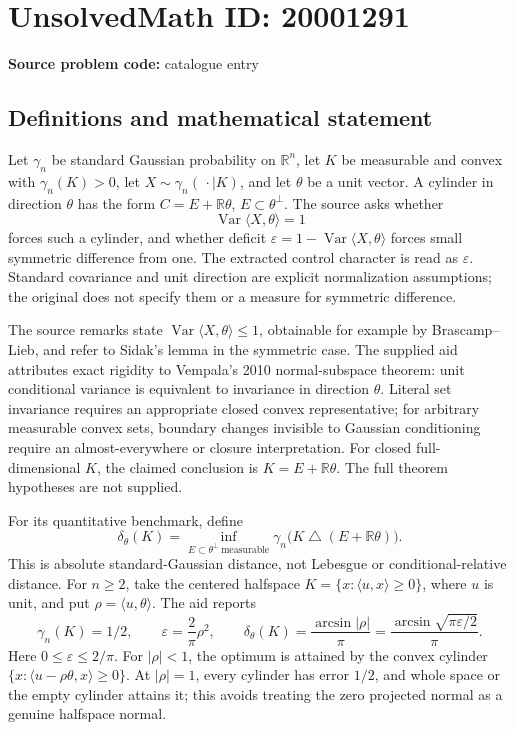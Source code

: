 \documentclass[11pt]{article}
\newcommand{\R}{\mathbb{R}}
\begin{document}
\section*{UnsolvedMath ID: 20001291}
\textbf{Source problem code:} catalogue entry
\subsection{Definitions and mathematical statement}
Let \(\gamma_n\) be standard Gaussian probability on \(\R^n\), let \(K\) be measurable and convex with \(\gamma_n(K)>0\), let \(X\sim\gamma_n(\,\cdot\mid K)\), and let \(\theta\) be a unit vector. A cylinder in direction \(\theta\) has the form \(C=E+\R\theta\), \(E\subset\theta^\perp\). The source asks whether
\[
 \operatorname{Var}\langle X,\theta\rangle=1
\]
forces such a cylinder, and whether deficit \(\varepsilon=1-\operatorname{Var}\langle X,\theta\rangle\) forces small symmetric difference from one. The extracted control character is read as \(\varepsilon\). Standard covariance and unit direction are explicit normalization assumptions; the original does not specify them or a measure for symmetric difference.

The source remarks state \(\operatorname{Var}\langle X,\theta\rangle\le1\), obtainable for example by Brascamp--Lieb, and refer to Sidak's lemma in the symmetric case. The supplied aid attributes exact rigidity to Vempala's 2010 normal-subspace theorem: unit conditional variance is equivalent to invariance in direction \(\theta\). Literal set invariance requires an appropriate closed convex representative; for arbitrary measurable convex sets, boundary changes invisible to Gaussian conditioning require an almost-everywhere or closure interpretation. For closed full-dimensional \(K\), the claimed conclusion is \(K=E+\R\theta\). The full theorem hypotheses are not supplied.

For its quantitative benchmark, define
\[
 \delta_\theta(K)=\inf_{E\subset\theta^\perp\ \mathrm{measurable}}
 \gamma_n\bigl(K\mathbin{\triangle}(E+\R\theta)\bigr).
\]
This is absolute standard-Gaussian distance, not Lebesgue or conditional-relative distance. For \(n\ge2\), take the centered halfspace \(K=\{x:\langle u,x\rangle\ge0\}\), where \(u\) is unit, and put \(\rho=\langle u,\theta\rangle\). The aid reports
\[
 \gamma_n(K)=1/2,\qquad
 \varepsilon=\frac2\pi\rho^2,\qquad
 \delta_\theta(K)=\frac{\arcsin|\rho|}{\pi}
 =\frac{\arcsin\sqrt{\pi\varepsilon/2}}{\pi}.
\]
Here \(0\le\varepsilon\le2/\pi\). For \(|\rho|<1\), the optimum is attained by the convex cylinder
\(\{x:\langle u-\rho\theta,x\rangle\ge0\}\).
At \(|\rho|=1\), every cylinder has error \(1/2\), and whole space or the empty cylinder attains it; this avoids treating the zero projected normal as a genuine halfspace normal.
\end{document}
